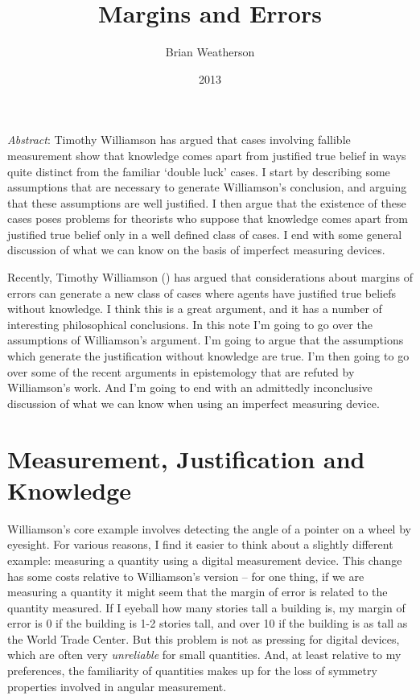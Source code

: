 \documentclass[
  11pt,
  letterpaper,
  DIV=11,
  numbers=noendperiod,
  twoside]{scrartcl}
\title{Margins and Errors}
\author{Brian Weatherson}
\date{2013}
\renewenvironment{abstract}
 {\vspace{-1.25cm}
 \quotation\small\noindent\emph{Abstract}:}
 {\endquotation}
\begin{document}
\maketitle
\begin{abstract}
Timothy Williamson has argued that cases involving fallible measurement
show that knowledge comes apart from justified true belief in ways quite
distinct from the familiar `double luck' cases. I start by describing
some assumptions that are necessary to generate Williamson's conclusion,
and arguing that these assumptions are well justified. I then argue that
the existence of these cases poses problems for theorists who suppose
that knowledge comes apart from justified true belief only in a well
defined class of cases. I end with some general discussion of what we
can know on the basis of imperfect measuring devices.
\end{abstract}


Recently, Timothy Williamson ()
has argued that considerations about margins of errors can generate a
new class of cases where agents have justified true beliefs without
knowledge. I think this is a great argument, and it has a number of
interesting philosophical conclusions. In this note I'm going to go over
the assumptions of Williamson's argument. I'm going to argue that the
assumptions which generate the justification without knowledge are true.
I'm then going to go over some of the recent arguments in epistemology
that are refuted by Williamson's work. And I'm going to end with an
admittedly inconclusive discussion of what we can know when using an
imperfect measuring device.

\section{Measurement, Justification and
Knowledge}\label{measurement-justification-and-knowledge}

Williamson's core example involves detecting the angle of a pointer on a
wheel by eyesight. For various reasons, I find it easier to think about
a slightly different example: measuring a quantity using a digital
measurement device. This change has some costs relative to Williamson's
version -- for one thing, if we are measuring a quantity it might seem
that the margin of error is related to the quantity measured. If I
eyeball how many stories tall a building is, my margin of error is 0 if
the building is 1-2 stories tall, and over 10 if the building is as tall
as the World Trade Center. But this problem is not as pressing for
digital devices, which are often very \emph{unreliable} for small
quantities. And, at least relative to my preferences, the familiarity of
quantities makes up for the loss of symmetry properties involved in
angular measurement.
\end{document}
